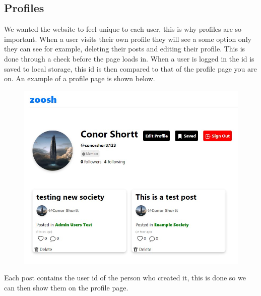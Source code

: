 \subsection{Profiles}
We wanted the website to feel unique to each user, this is why profiles are so important. When a user visits their own profile they will see a some option only they can see for example, deleting their posts and editing their profile. This is done through a check before the page loads in. When a user is logged in the id is saved to local storage, this id is then compared to that of the profile page you are on. An example of a profile page is shown below.
\begin{figure}[H]
  \centering
  \includegraphics[scale=0.4]{img/user_profile.jpg}
  \label{fig:Profile}
\end{figure}
Each post contains the user id of the person who created it, this is done so we can then show them on the profile page.

